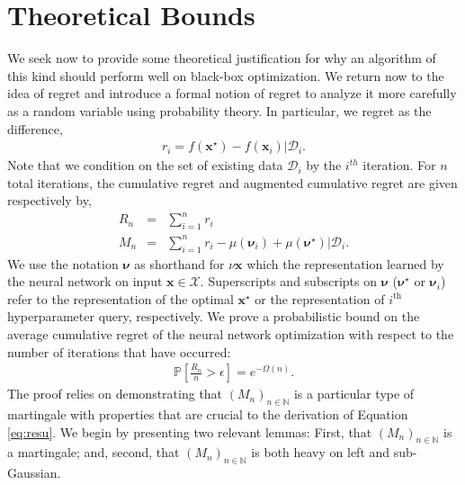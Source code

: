 \documentclass[]{article}
\newcommand{\paren}[1]{\left({#1}\right)}
\newcommand{\brac}[1]{\left[{#1}\right]}
\renewcommand{\Pr}[1]{\mathbb{P}\brac{{#1}}}
\newcommand{\1}{\mathbf{1}}
\newcommand{\0}{\mathbf{0}}
\newcommand{\X}{\mathcal{X}}
\newcommand{\x}{\mathbf{x}}
\begin{document}
\section{Theoretical Bounds}
\label{sec:theo-boun}

We seek now to provide some theoretical justification for why an algorithm of this kind should perform well on black-box optimization. We return now to the idea of regret and introduce a formal notion of regret to analyze it more carefully as a random variable using probability theory. In particular, we regret as the difference,
\begin{eqnarray}
  r_i = f\paren{\x^\star} - f\paren{\x_i} | \mathcal{D}_i.  
\end{eqnarray}
Note that we condition on the set of existing data $\mathcal{D}_i$ by the $i^{th}$ iteration. For $n$ total iterations, the cumulative regret and augmented cumulative regret are given respectively by,
\begin{eqnarray}
  R_n &=& \sum_{i=1}^n r_i \\
  M_n &=& \sum_{i=1}^n r_i - \mu\paren{\boldsymbol{\nu}_i} + \mu\paren{\boldsymbol{\nu}^\star} | \mathcal{D}_i.
\end{eqnarray}
We use the notation $\boldsymbol{\nu}$ as shorthand for $\nu\boldsymbol{\x}$ which the representation learned by the neural network on input $\x\in\X$. Superscripts and subscripts on $\boldsymbol{\nu}$ ($\boldsymbol{\nu}^\star$ or $\boldsymbol{\nu}_i$) refer to the representation of the optimal $\x^\star$ or the representation of $i^\text{th}$ hyperparameter query, respectively. We prove a probabilistic bound on the average cumulative regret of the neural network optimization with respect to the number of iterations that have occurred:
\begin{eqnarray}
  \label{eq:resu}
  \Pr{\frac{R_n}{n} > \epsilon} = e^{-\Omega(n)}.
\end{eqnarray}
The proof relies on demonstrating that $(M_n)_{n \in \mathbb{N}}$ is a particular type of martingale with properties that are crucial to the derivation of Equation \ref{eq:resu}. We begin by presenting two relevant lemmas: First, that $(M_n)_{n \in \mathbb{N}}$ is a martingale; and, second, that $(M_n)_{n \in \mathbb{N}}$ is both heavy on left and sub-Gaussian. 
\end{document}
